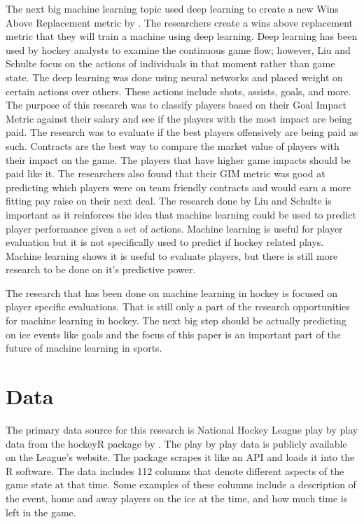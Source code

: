 \documentclass[12pt,english]{article}
\begin{document}
The next big machine learning topic used deep learning to create a new Wins Above Replacement metric by \citet{Liu}. The researchers create a wins above replacement metric that they will train a machine using deep learning. Deep learning has been used by hockey analysts to examine the continuous game flow; however, Liu and Schulte focus on the actions of individuals in that moment rather than game state. The deep learning was done using neural networks and placed weight on certain actions over others. These actions include shots, assists, goals, and more. The purpose of this research was to classify players based on their Goal Impact Metric against their salary and see if the players with the most impact are being paid. The research was to evaluate if the best players offensively are being paid as such. Contracts are the best way to compare the market value of players with their impact on the game. The players that have higher game impacts should be paid like it. The researchers also found that their GIM metric was good at predicting which players were on team friendly contracts and would earn a more fitting pay raise on their next deal. The research done by Liu and Schulte is important as it reinforces the idea that machine learning could be used to predict player performance given a set of actions. Machine learning is useful for player evaluation but it is not specifically used to predict if hockey related plays. Machine learning shows it is useful to evaluate players, but there is still more research to be done on it's predictive power. 

The research that has been done on machine learning in hockey is focused on player specific evaluations. That is still only a part of the research opportunities for machine learning in hockey. The next big step should be actually predicting on ice events like goals and the focus of this paper is an important part of the future of machine learning in sports. 

\section{Data}\label{sec:data}
The primary data source for this research is National Hockey League play by play data from the hockeyR package by \citet{hockeyR}. The play by play data is publicly available on the League's website. The package scrapes it like an API and loads it into the R software. The data includes 112 columns that denote different aspects of the game state at that time. Some examples of these columns include a description of the event, home and away players on the ice at the time, and how much time is left in the game.
\end{document}
